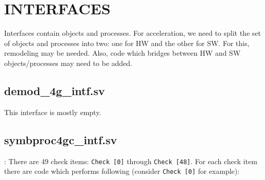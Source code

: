 \documentclass{note}
\begin{document}
\section{INTERFACES}
Interfaces contain objects and processes.  For acceleration, we need to split the set of objects and processes into two: one for HW and the other for SW.
For this, remodeling may be needed. Also, code which bridges between HW and 
SW objects/processes may need to be added. 

\subsection{demod\_4g\_intf.sv}
%
\bit
\w This interface is mostly empty.
\eit

\subsection{symbproc4gc\_intf.sv}
%
\bit
\w {}: 
   \bit
   \w There are 49 check items: \verb+Check [0]+ through \verb+Check [48]+.
   \w For each check item there are code which performs following (consider
   \verb+Check [0]+ for example):
\end{document}

